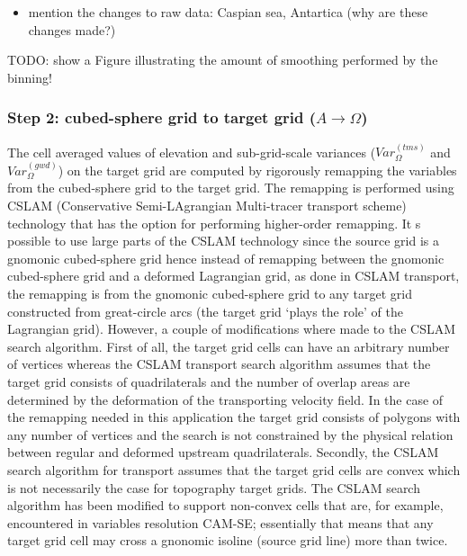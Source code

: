 \documentclass[gmd]{copernicus}
\begin{document}
\begin{itemize}
\item mention the changes to raw data: Caspian sea, Antartica (why are these changes made?)
\end{itemize}

%
%
TODO: show a Figure illustrating the amount of smoothing performed by the binning!
%
\subsubsection{Step 2: cubed-sphere grid to target grid ($A\rightarrow \Omega$)}\label{sec:step2}
The cell averaged values of elevation and sub-grid-scale variances ($Var^{(tms)}_{\Omega}$ and $Var^{(gwd)}_\Omega$) on the target grid are computed by rigorously remapping the variables from the cubed-sphere grid to the target grid.  The remapping is performed using CSLAM (Conservative Semi-LAgrangian Multi-tracer transport scheme) technology \citep{LNU2010JCP} that has the option for performing higher-order remapping. It s possible to use large parts of the CSLAM technology since the source grid is a gnomonic cubed-sphere grid hence instead of remapping between the gnomonic cubed-sphere grid and a deformed Lagrangian grid, as done in CSLAM transport, the remapping is from the gnomonic cubed-sphere grid to any target grid constructed from great-circle arcs (the target grid `plays the role' of the Lagrangian grid). However, a couple of modifications where made to the CSLAM search algorithm. First of all, the target grid cells can have an arbitrary number of vertices whereas the CSLAM transport search algorithm assumes that the target grid consists of quadrilaterals and the number of overlap areas are determined by the deformation of the transporting velocity field. In the case of the remapping needed in this application the target grid consists of polygons with any number of vertices and the search is not constrained by the physical relation between regular and deformed upstream quadrilaterals. Secondly, the CSLAM search algorithm for transport assumes that the target grid cells are convex which is not necessarily the case for topography target grids. The CSLAM search algorithm has been modified to support non-convex cells that are, for example, encountered in variables resolution CAM-SE; essentially that means that any target grid cell may cross a gnonomic isoline (source grid line) more than twice.
\end{document}
